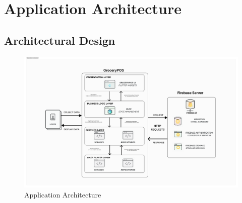 \documentclass[../thesis.tex]{subfiles}
\begin{document}
\section{Application Architecture}

\subsection{Architectural Design}
\begin{figure}[H]
    \centering
    \includegraphics[width=1\textwidth]{images/Application-Architecture.png}
    \caption{Application Architecture}
    \label{fig:application-architecture}
\end{figure}
\end{document}
